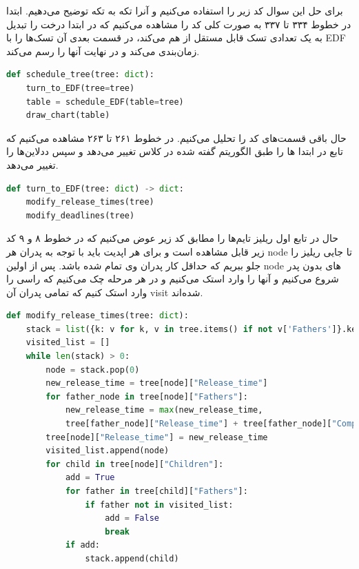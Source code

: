 برای حل این سوال کد زیر را استفاده می‌کنیم و آنرا تکه به تکه توضیح می‌دهیم.
ابتدا در خطوط ۳۳۴ تا ۳۳۷ به صورت کلی کد را مشاهده می‌کنیم که در ابتدا درخت را تبدیل به یک تعدادی تسک قابل مستقل از هم می‌کند، در قسمت بعدی آن تسک‌ها را با 
EDF 
زمان‌بندی می‌کند و در نهایت 
آنها را رسم می‌کند.
\begin{latin}
    \begin{lstlisting}[language=python,style=mystyle]
def schedule_tree(tree: dict):
    turn_to_EDF(tree=tree)
    table = schedule_EDF(table=tree)
    draw_chart(table)
    \end{lstlisting}
\end{latin}
حال باقی قسمت‌های کد را تحلیل می‌کنیم.
در خطوط ۲۶۱ تا ۲۶۳ مشاهده می‌کنیم که تابع 
در ابتدا  
ها 
را طبق الگوریتم گفته شده در کلاس تغییر می‌دهد و سپس 
ددلاین‌ها را تغییر می‌دهد.
\begin{latin}
    \begin{lstlisting}[language=python,style=mystyle]
def turn_to_EDF(tree: dict) -> dict:
    modify_release_times(tree)
    modify_deadlines(tree)
    \end{lstlisting}
\end{latin}

حال در تابع اول ریلیز تایم‌ها را مطابق کد زیر 
عوض می‌کنیم که در خطوط ۸ و ۹ کد زیر قابل مشاهده است و برای هر اپدیت باید با 
توجه به پدران هر node 
تا جایی ریلیز را جلو ببریم که حداقل کار پدران وی 
تمام شده باشد. 
پس از اولین node 
های بدون پدر شروع می‌کنیم و آنها را وارد استک می‌کنیم 
و در هر مرحله چک می‌کنیم که راسی را وارد استک کنیم 
که تمامی پدران آن visit 
شده‌اند.

\begin{latin}
    \begin{lstlisting}[language=python,style=mystyle]
def modify_release_times(tree: dict):
    stack = list({k: v for k, v in tree.items() if not v['Fathers']}.keys())
    visited_list = []
    while len(stack) > 0:
        node = stack.pop(0)
        new_release_time = tree[node]["Release_time"]
        for father_node in tree[node]["Fathers"]:
            new_release_time = max(new_release_time, 
            tree[father_node]["Release_time"] + tree[father_node]["Computation_time"])
        tree[node]["Release_time"] = new_release_time
        visited_list.append(node)
        for child in tree[node]["Children"]:
            add = True
            for father in tree[child]["Fathers"]:
                if father not in visited_list:
                    add = False
                    break
            if add:
                stack.append(child)
    \end{lstlisting}
\end{latin}

